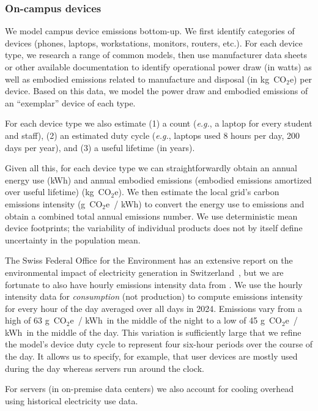 \documentclass[11pt]{article}
\let\cite\parencite
\newcommand{\eg}{{\em e.g.}}
\newcommand{\coe}{CO$_2$e}
\newcommand{\gcoe}{g~\coe}
\newcommand{\kgcoe}{k\gcoe}
\newcommand{\gcoekwh}{\gcoe\ / kWh}
\begin{document}
\subsubsection*{On-campus devices}

We model campus device emissions bottom-up. We first identify categories of
devices (phones, laptops, workstations, monitors, routers, etc.). For each
device type, we research a range of common models, then use manufacturer data
sheets or other available documentation to identify operational power draw (in
watts) as well as embodied emissions related to manufacture and disposal (in
\kgcoe) per device. Based on this data, we model the power draw and embodied
emissions of an ``exemplar'' device of each type.

For each device type we also estimate (1) a count (\eg, a laptop for every
student and staff), (2) an estimated duty cycle (\eg, laptops used 8 hours per
day, 200 days per year), and (3) a useful lifetime (in years).

Given all this, for each device type we can straightforwardly obtain an annual
energy use (kWh) and annual embodied emissions (embodied emissions amortized
over useful lifetime) (\kgcoe). We then estimate the local grid's carbon
emissions intensity (\gcoekwh) to convert the energy use to emissions and obtain
a combined total annual emissions number. We use deterministic mean device
footprints; the variability of individual products does not by itself define
uncertainty in the population mean.

The Swiss Federal Office for the Environment has an extensive report on the
environmental impact of electricity generation in
Switzerland~\cite{krebs2018umweltbilanz}, but we are fortunate to also have
hourly emissions intensity data from \textcite{electricitymaps}. We use the
hourly intensity data for {\em consumption} (not production) to compute
emissions intensity for every hour of the day averaged over all days in 2024.
Emissions vary from a high of 63 \gcoekwh\ in the middle of the night to a low
of 45 \gcoekwh\ in the middle of the day. This variation is sufficiently large
that we refine the model's device duty cycle to represent four six-hour periods
over the course of the day. It allows us to specify, for example, that user
devices are mostly used during the day whereas servers run around the clock.

For servers (in on-premise data centers) we also account for cooling overhead
using historical electricity use data.
\end{document}
